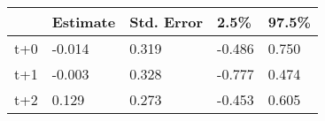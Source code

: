 \begin{tabular}{lllll}
  \toprule
  & Estimate & Std. Error & 2.5\% & 97.5\% \\ 
  \midrule
t+0 & -0.014 & 0.319 & -0.486 & 0.750 \\ 
  t+1 & -0.003 & 0.328 & -0.777 & 0.474 \\ 
  t+2 & 0.129 & 0.273 & -0.453 & 0.605 \\ 
   \bottomrule
\end{tabular}
